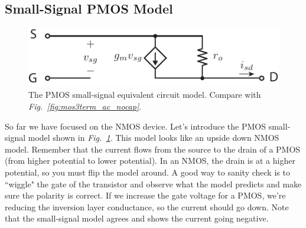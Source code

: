 \subsection{Small-Signal PMOS Model}
\begin{figure}[tb]
\centering
\includegraphics[scale=1]{pmos3term_dc}
\caption{The PMOS small-signal equivalent circuit model.  Compare with \emph{Fig.~\ref{fig:mos3term_ac_nocap}}.}
\label{fig:pmos3term_dc}
\end{figure}
So far we have focused on the NMOS device. Let's introduce the PMOS small-signal model shown in \emph{Fig.~\ref{fig:pmos3term_dc}}.  This model looks like an upside down NMOS model.  Remember that the current flows from the source to the drain of a PMOS (from higher potential to lower potential).  In an NMOS, the drain is at a higher potential, so you must flip the model around.   A good way to sanity check is to ``wiggle" the gate of the transistor and observe what the model predicts and make sure the polarity is correct.  If we increase the gate voltage for a PMOS, we're reducing the inversion layer conductance, so the current should go down. Note that the small-signal model agrees and shows the current going negative.
